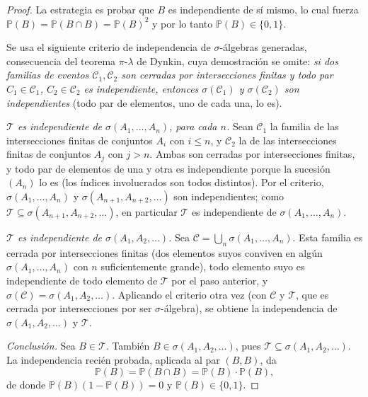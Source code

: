 \documentclass[11pt, a4paper]{article}
\begin{document}
\begin{proof}
La estrategia es probar que $B$ es independiente de sí mismo, lo cual fuerza $\mathbb{P}(B) =
\mathbb{P}(B \cap B) = \mathbb{P}(B)^2$ y por lo tanto $\mathbb{P}(B) \in \{0, 1\}$.

Se usa el siguiente criterio de independencia de $\sigma$-álgebras generadas, consecuencia del
teorema $\pi$-$\lambda$ de Dynkin, cuya demostración se omite: \emph{si dos familias de eventos
$\mathcal{C}_1, \mathcal{C}_2$ son cerradas por intersecciones finitas y todo par $C_1 \in
\mathcal{C}_1$, $C_2 \in \mathcal{C}_2$ es independiente, entonces $\sigma(\mathcal{C}_1)$ y
$\sigma(\mathcal{C}_2)$ son independientes} (todo par de elementos, uno de cada una, lo es).

\textit{$\mathcal{T}$ es independiente de $\sigma(A_1, \dots, A_n)$, para cada $n$.} Sean
$\mathcal{C}_1$ la familia de las intersecciones finitas de conjuntos $A_i$ con $i \le n$, y
$\mathcal{C}_2$ la de las intersecciones finitas de conjuntos $A_j$ con $j > n$. Ambas son
cerradas por intersecciones finitas, y todo par de elementos de una y otra es independiente
porque la sucesión $(A_n)$ lo es (los índices involucrados son todos distintos). Por el
criterio, $\sigma(A_1, \dots, A_n)$ y $\sigma(A_{n+1}, A_{n+2}, \dots)$ son independientes; como
$\mathcal{T} \subseteq \sigma(A_{n+1}, A_{n+2}, \dots)$, en particular $\mathcal{T}$ es
independiente de $\sigma(A_1, \dots, A_n)$.

\textit{$\mathcal{T}$ es independiente de $\sigma(A_1, A_2, \dots)$.} Sea $\mathcal{C} =
\bigcup_n \sigma(A_1, \dots, A_n)$. Esta familia es cerrada por intersecciones finitas (dos
elementos suyos conviven en algún $\sigma(A_1, \dots, A_n)$ con $n$ suficientemente grande),
todo elemento suyo es independiente de todo elemento de $\mathcal{T}$ por el paso anterior, y
$\sigma(\mathcal{C}) = \sigma(A_1, A_2, \dots)$. Aplicando el criterio otra vez (con
$\mathcal{C}$ y $\mathcal{T}$, que es cerrada por intersecciones por ser $\sigma$-álgebra), se
obtiene la independencia de $\sigma(A_1, A_2, \dots)$ y $\mathcal{T}$.

\textit{Conclusión.} Sea $B \in \mathcal{T}$. También $B \in \sigma(A_1, A_2, \dots)$, pues
$\mathcal{T} \subseteq \sigma(A_1, A_2, \dots)$. La independencia recién probada, aplicada al
par $(B, B)$, da
$$ \mathbb{P}(B) = \mathbb{P}(B \cap B) = \mathbb{P}(B) \cdot \mathbb{P}(B), $$
de donde $\mathbb{P}(B)(1 - \mathbb{P}(B)) = 0$ y $\mathbb{P}(B) \in \{0, 1\}$.
\end{proof}
\end{document}
